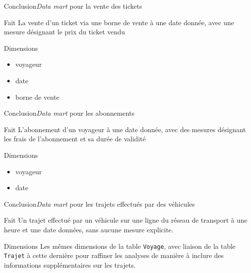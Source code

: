\documentclass[a4paper,12pt,usenames,dvipsnames]{beamer}
\begin{document}
\begin{frame}{Conclusion}{\textit{Data mart} pour la vente des tickets}
  \begin{block}{Fait}
    La vente d'un ticket via une borne de vente à une date donnée, avec une mesure désignant le prix du ticket vendu
  \end{block}

  \begin{block}{Dimensions}
    \begin{itemize}
      \item voyageur
      \item date
      \item borne de vente
    \end{itemize}
  \end{block}
\end{frame}

\begin{frame}{Conclusion}{\textit{Data mart} pour les abonnements}
  \begin{block}{Fait}
    L'abonnement d'un voyageur à une date donnée, avec des mesures désignant les frais de l'abonnement et sa durée de validité
  \end{block}

  \begin{block}{Dimensions}
    \begin{itemize}
      \item voyageur
      \item date
    \end{itemize}
  \end{block}
\end{frame}

\begin{frame}{Conclusion}{\textit{Data mart} pour les trajets effectués par des véhicules}
  \begin{block}{Fait}
    Un trajet effectué par un véhicule sur une ligne du réseau de transport à une heure et une date données, sans aucune mesure explicite.
  \end{block}

  \begin{block}{Dimensions}
    Les mêmes dimensions de la table \texttt{Voyage}, avec liaison de la table \texttt{Trajet} à cette dernière pour raffiner les analyses de manière à inclure des informations supplémentaires sur les trajets.
  \end{block}
\end{frame}
\end{document}
